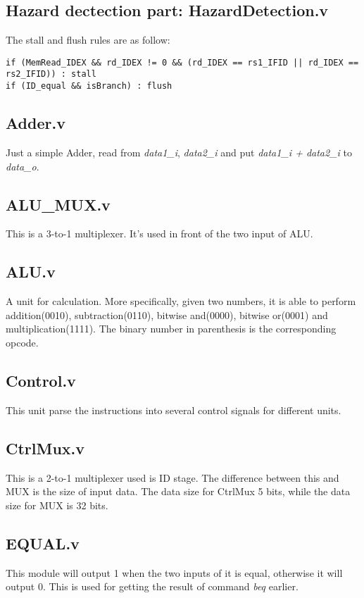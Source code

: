 \documentclass{article}
\begin{document}
\subsection{Hazard dectection part: HazardDetection.v}
The stall and flush rules are as follow:

\begin{lstlisting}[language=text, caption=Rules, xleftmargin=10pt, xrightmargin=10pt, mathescape=true]
if (MemRead_IDEX && rd_IDEX != 0 && (rd_IDEX == rs1_IFID || rd_IDEX == rs2_IFID)) : stall
if (ID_equal && isBranch) : flush\end{lstlisting}

\subsection{Adder.v}
Just a simple Adder, read from \textit{data1\_i}, \textit{data2\_i} and put \textit{data1\_i + data2\_i} to \textit{data\_o}.

\subsection{ALU\_MUX.v}
This is a 3-to-1 multiplexer. It's used in front of the two input of ALU.

\subsection{ALU.v}
A unit for calculation. More specifically, given two numbers, it is able to perform addition(0010), subtraction(0110), bitwise and(0000), bitwise or(0001) and multiplication(1111). The binary number in parenthesis is the corresponding opcode.

\subsection{Control.v}
This unit parse the instructions into several control signals for different units.

\subsection{CtrlMux.v}
This is a 2-to-1 multiplexer used is ID stage. The difference between this and MUX is the size of input data. The data size for CtrlMux 5 bits, while the data size for MUX is 32 bits.

\subsection{EQUAL.v}
This module will output 1 when the two inputs of it is equal, otherwise it will output 0. This is used for getting the result of command \textit{beq} earlier.
\end{document}
